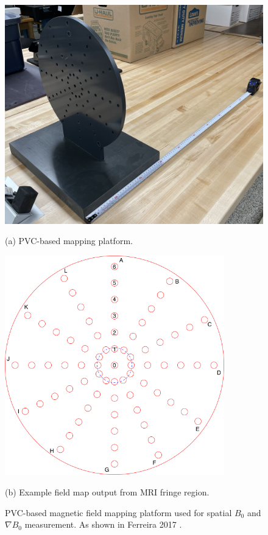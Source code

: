 \begin{figure}[H]
	\centering
	\begin{minipage}[t]{0.48\textwidth}
		\centering
		\includegraphics[width=\textwidth]{Assests/Picture3.jpg}
		\caption*{(a) PVC-based mapping platform.}
	\end{minipage}%
	\hfill
	\begin{minipage}[t]{0.48\textwidth}
		\centering
		\includegraphics[width=0.85\textwidth]{Assests/MagFieldMap.png}
		\caption*{(b) Example field map output from MRI fringe region.}
	\end{minipage}
	\caption{PVC-based magnetic field mapping platform used for spatial $B_0$ and $\nabla B_0$ measurement. As shown in Ferreira 2017 \cite{haddixProposal,ferreira2017}.}
	\label{fig:fieldmapping}
\end{figure}


